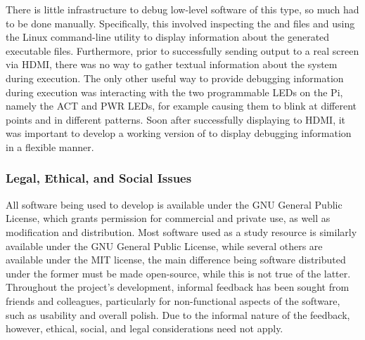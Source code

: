         There is little infrastructure to debug low-level software of this type,
        so much had to be done manually. Specifically, this involved inspecting
        the  and  files and using the Linux command-line
        utility  \cite{nm} to display information about the generated
        executable files. Furthermore, prior to successfully sending output to a
        real screen via HDMI, there was no way to gather textual information
        about the system during execution. The only other useful way to provide
        debugging information during execution was interacting with the two
        programmable LEDs on the Pi, namely the ACT and PWR LEDs, for example
        causing them to blink at different points and in different patterns.
        Soon after successfully displaying to HDMI, it was important to develop
        a working version of  to display debugging information in a
        flexible manner.

    \subsubsection{Legal, Ethical, and Social Issues}
        All software being used to develop is available under the GNU General
        Public License, which grants permission for commercial and private use,
        as well as modification and distribution. Most software used as a study
        resource is similarly available under the GNU General Public License,
        while several others are available under the MIT license, the main
        difference being software distributed under the former must be made
        open-source, while this is not true of the latter. Throughout the
        project's development, informal feedback has been sought from friends
        and colleagues, particularly for non-functional aspects of the software,
        such as usability and overall polish. Due to the informal nature of the
        feedback, however, ethical, social, and legal considerations need not
        apply.
